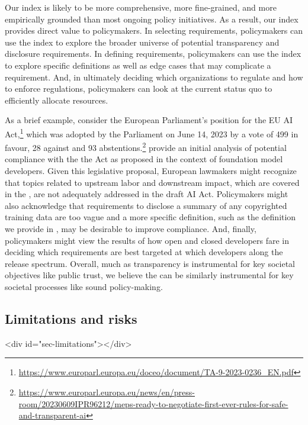 \documentclass[screen, authorversion, acmsmall]{acmart}
\begin{document}
Our index is likely to be more comprehensive, more fine-grained, and more empirically grounded than most ongoing policy initiatives.
As a result, our index provides direct value to policymakers.
In selecting requirements, policymakers can use the index to explore the broader universe of potential transparency and disclosure requirements.
In defining requirements, policymakers can use the index to explore specific definitions as well as edge cases that may complicate a requirement. 
And, in ultimately deciding which organizations to regulate and how to enforce regulations, policymakers can look at the current status quo to efficiently allocate resources.

As a brief example, consider the European Parliament's position for the EU AI Act,\footnote{\url{https://www.europarl.europa.eu/doceo/document/TA-9-2023-0236_EN.pdf}} which was adopted by the Parliament on June 14, 2023 by a vote of 499 in favour, 28 against and 93 abstentions.\footnote{\url{https://www.europarl.europa.eu/news/en/press-room/20230609IPR96212/meps-ready-to-negotiate-first-ever-rules-for-safe-and-transparent-ai}}
\citet{bommasani2023eu-ai-act} provide an initial analysis of potential compliance with the the Act as proposed in the context of foundation model developers.
Given this legislative proposal, European lawmakers might recognize that topics related to upstream labor and downstream impact, which are covered in the \projectname, are not adequately addressed in the draft AI Act.
Policymakers might also acknowledge that requirements to disclose a summary of any copyrighted training data are too vague and a more specific definition, such as the definition we provide in , may be desirable to improve compliance.
And, finally, policymakers might view the results of how open and closed developers fare in deciding which requirements are best targeted at which developers along the release spectrum.
Overall, much as transparency is instrumental for key societal objectives like public trust, we believe the \projectname can be similarly instrumental for key societal processes like sound policy-making.

\hypertarget{limitations}{\subsection{Limitations and risks}}
<div id="sec-limitations"></div>
\end{document}
